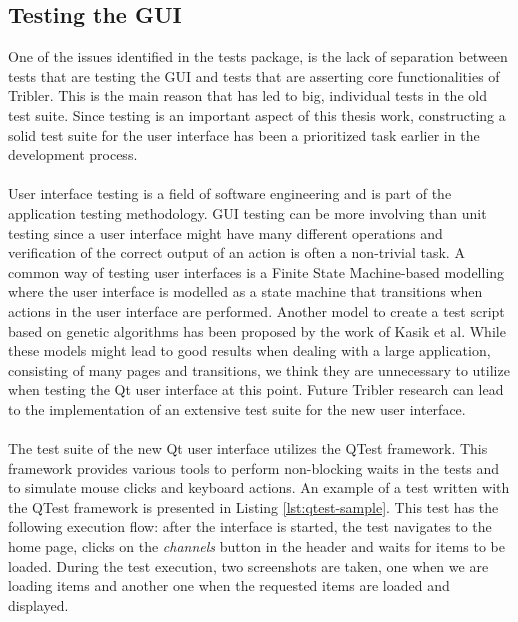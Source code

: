 \subsection{Testing the GUI}
One of the issues identified in the tests package, is the lack of separation between tests that are testing the GUI and tests that are asserting core functionalities of Tribler. This is the main reason that has led to big, individual tests in the old test suite. Since testing is an important aspect of this thesis work, constructing a solid test suite for the user interface has been a prioritized task earlier in the development process.\\\\
User interface testing is a field of software engineering and is part of the application testing methodology. GUI testing can be more involving than unit testing since a user interface might have many different operations and verification of the correct output of an action is often a non-trivial task. A common way of testing user interfaces is a Finite State Machine-based modelling where the user interface is modelled as a state machine that transitions when actions in the user interface are performed\cite{clarke1998automated}\cite{belli2001finite}. Another model to create a test script based on genetic algorithms has been proposed by the work of Kasik et al\cite{kasik1996toward}. While these models might lead to good results when dealing with a large application, consisting of many pages and transitions, we think they are unnecessary to utilize when testing the Qt user interface at this point. Future Tribler research can lead to the implementation of an extensive test suite for the new user interface.\\\\
The test suite of the new Qt user interface utilizes the QTest framework. This framework provides various tools to perform non-blocking waits in the tests and to simulate mouse clicks and keyboard actions. An example of a test written with the QTest framework is presented in Listing \ref{lst:qtest-sample}. This test has the following execution flow: after the interface is started, the test navigates to the home page, clicks on the \emph{channels} button in the header and waits for items to be loaded. During the test execution, two screenshots are taken, one when we are loading items and another one when the requested items are loaded and displayed.\\\\
